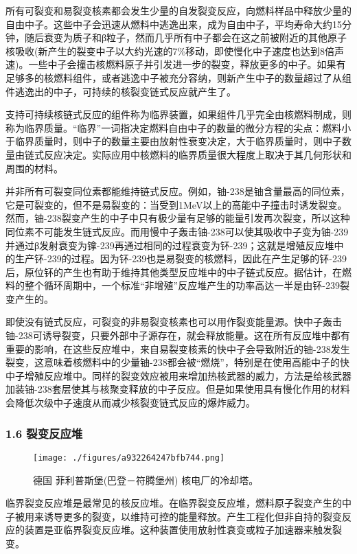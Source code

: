 所有可裂变和易裂变核素都会发生少量的自发裂变反应，向燃料样品中释放少量的自由中子。这些中子会迅速从燃料中逃逸出来，成为自由中子，平均寿命大约15分钟，随后衰变为质子和β粒子，然而几乎所有中子都会在这之前被附近的其他原子核吸收(新产生的裂变中子以大约光速的7\%移动，即使慢化中子速度也达到8倍声速)。一些中子会撞击核燃料原子并引发进一步的裂变，释放更多的中子。如果有足够多的核燃料组件，或者逃逸中子被充分容纳，则新产生中子的数量超过了从组件逃逸出的中子，可持续的核裂变链式反应就产生了。

支持可持续核链式反应的组件称为临界装置，如果组件几乎完全由核燃料制成，则称为临界质量。“临界”一词指决定燃料自由中子的数量的微分方程的尖点：燃料小于临界质量时，则中子的数量主要由放射性衰变决定，大于临界质量时，则中子数量由链式反应决定。实际应用中核燃料的临界质量很大程度上取决于其几何形状和周围的材料。

并非所有可裂变同位素都能维持链式反应。例如，铀-238是铀含量最高的同位素，它是可裂变的，但不是易裂变的：当受到1MeV以上的高能中子撞击时诱发裂变。然而，铀-238裂变产生的中子中只有极少量有足够的能量引发再次裂变，所以这种同位素不可能发生链式反应。而用慢中子轰击铀-238可以使其吸收中子变为铀-239并通过β发射衰变为镎-239再通过相同的过程衰变为钚-239；这就是增殖反应堆中的生产钚-239的过程。因为钚-239也是易裂变的核燃料，因此在产生足够的钚-239后，原位钚的产生也有助于维持其他类型反应堆中的中子链式反应。据估计，在燃料的整个循环周期中，一个标准“非增殖”反应堆产生的功率高达一半是由钚-239裂变产生的。

即使没有链式反应，可裂变的非易裂变核素也可以用作裂变能量源。快中子轰击铀-238可诱导裂变，只要外部中子源存在，就会释放能量。这在所有反应堆中都有重要的影响，在这些反应堆中，来自易裂变核素的快中子会导致附近的铀-238发生裂变，这意味着核燃料中的少量铀-238都会被“燃烧”，特别是在使用高能中子的快中子增殖反应堆中。同样的裂变效应被用来增加热核武器的威力，方法是给核武器加装铀-238套层使其与核聚变释放的中子反应。但是如果使用具有慢化作用的材料会降低次级中子速度从而减少核裂变链式反应的爆炸威力。

\subsubsection{1.6 裂变反应堆}
\begin{figure}[ht]
\centering
\texttt{[image: ./figures/a932264247bfb744.png]}
\caption{德国 菲利普斯堡(巴登－符腾堡州) 核电厂的冷却塔。} \label{fig_HLB_7}
\end{figure}
临界裂变反应堆是最常见的核反应堆。在临界裂变反应堆，燃料原子裂变产生的中子被用来诱导更多的裂变，以维持可控的能量释放。产生工程化但非自持的裂变反应的装置是亚临界裂变反应堆。这种装置使用放射性衰变或粒子加速器来触发裂变。

